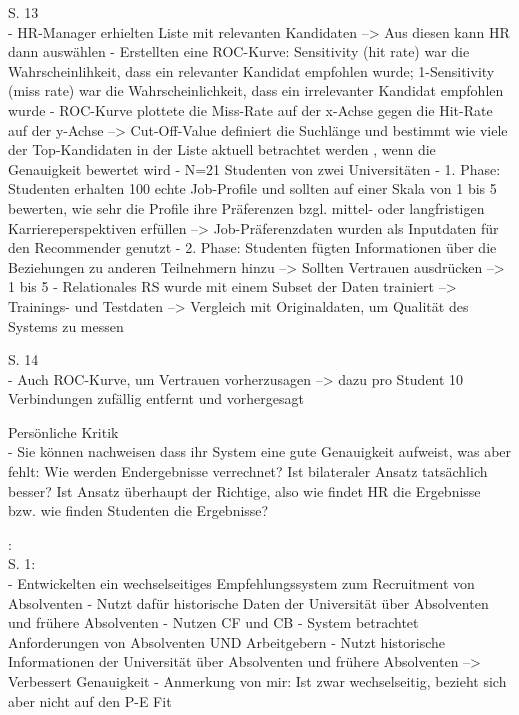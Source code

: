 S. 13\\
- HR-Manager erhielten Liste mit relevanten Kandidaten --> Aus diesen kann HR dann auswählen
- Erstellten eine ROC-Kurve: Sensitivity (hit rate) war die Wahrscheinlihkeit, dass ein relevanter Kandidat empfohlen wurde; 1-Sensitivity (miss rate) war die Wahrscheinlichkeit, dass ein irrelevanter Kandidat empfohlen wurde
- ROC-Kurve plottete die Miss-Rate auf der x-Achse gegen die Hit-Rate auf der y-Achse --> Cut-Off-Value definiert die Suchlänge und bestimmt wie viele der Top-Kandidaten in der Liste aktuell betrachtet werden , wenn die Genauigkeit bewertet wird
- N=21 Studenten von zwei Universitäten
- 1. Phase: Studenten erhalten 100 echte Job-Profile und sollten auf einer Skala von 1 bis 5 bewerten, wie sehr die Profile ihre Präferenzen bzgl. mittel- oder langfristigen Karriereperspektiven erfüllen --> Job-Präferenzdaten wurden als Inputdaten für den Recommender genutzt
- 2. Phase: Studenten fügten Informationen über die Beziehungen zu anderen Teilnehmern hinzu --> Sollten Vertrauen ausdrücken --> 1 bis 5
- Relationales RS wurde mit einem Subset der Daten trainiert --> Trainings- und Testdaten --> Vergleich mit Originaldaten, um Qualität des Systems zu messen

S. 14\\
- Auch ROC-Kurve, um Vertrauen vorherzusagen --> dazu pro Student 10 Verbindungen zufällig entfernt und vorhergesagt

Persönliche Kritik\\
- Sie können nachweisen dass ihr System eine gute Genauigkeit aufweist, was aber fehlt: Wie werden Endergebnisse verrechnet? Ist bilateraler Ansatz tatsächlich besser? Ist Ansatz überhaupt der Richtige, also wie findet HR die Ergebnisse bzw. wie finden Studenten die Ergebnisse?






\textcite{ding:2016}:\\
S. 1:\\
- Entwickelten ein wechselseitiges Empfehlungssystem zum Recruitment von Absolventen
- Nutzt dafür historische Daten der Universität über Absolventen und frühere Absolventen
- Nutzen CF und CB
- System betrachtet Anforderungen von Absolventen UND Arbeitgebern
- Nutzt historische Informationen der Universität über Absolventen und frühere Absolventen --> Verbessert Genauigkeit
- Anmerkung von mir: Ist zwar wechselseitig, bezieht sich aber nicht auf den P-E Fit

